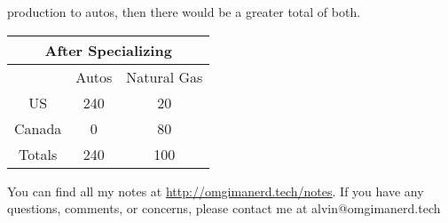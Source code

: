\documentclass[letterpaper, 12pt]{article}
\begin{document}
production to autos, then there would be a greater total of both.
\begin{center}
  \begin{tabular}{|c|c|c|}
    \hline
    \multicolumn{3}{|c|}{After Specializing} \\ \hline
           & Autos & Natural Gas  \\ \hline
    US     & 240 & 20             \\ \hline
    Canada & 0   & 80             \\ \hline
    Totals & 240 & 100            \\ \hline
  \end{tabular}
\end{center}

\begin{center}
  You can find all my notes at \url{http://omgimanerd.tech/notes}. If you have
  any questions, comments, or concerns, please contact me at
  alvin@omgimanerd.tech
\end{center}
\end{document}
